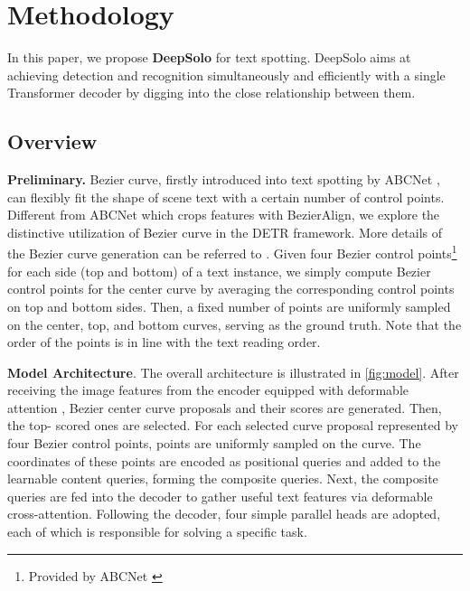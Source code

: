 \documentclass[10pt,twocolumn,letterpaper]{article}
\begin{document}
\section{Methodology}
\label{sec:method}
In this paper, we propose \textbf{DeepSolo} for text spotting. DeepSolo aims at achieving detection and recognition simultaneously and efficiently with a single Transformer decoder by digging into the close relationship between them.

\subsection{Overview}
\label{sec:overview}
\noindent\textbf{Preliminary.} Bezier curve, firstly introduced into text spotting by ABCNet \cite{liu2020abcnet}, can flexibly fit the shape of scene text with a certain number of control points. Different from ABCNet which crops features with BezierAlign, we explore the distinctive utilization of Bezier curve in the DETR framework. More details of the Bezier curve generation can be referred to \cite{liu2020abcnet, liu2021abcnet}. Given four Bezier control points\footnote{Provided by ABCNet \cite{liu2020abcnet}} for each side (top and bottom) of a text instance, we simply compute Bezier control points for the center curve by averaging the corresponding control points on top and bottom sides. Then, a fixed number of  points are uniformly sampled on the center, top, and bottom curves, serving as the ground truth. Note that the order of the points is in line with the text reading order.

\noindent\textbf{Model Architecture}. The overall architecture is illustrated in \cref{fig:model}. After receiving the image features from the encoder equipped with deformable attention \cite{zhu2020deformable}, Bezier center curve proposals and their scores are generated. Then, the top- scored ones are selected. For each selected curve proposal represented by four Bezier control points,  points are uniformly sampled on the curve. The coordinates of these points are encoded as positional queries and added to the learnable content queries, forming the composite queries. Next, the composite queries are fed into the decoder to gather useful text features via deformable cross-attention. Following the decoder, four simple parallel heads are adopted, each of which is responsible for solving a specific task. 
\end{document}
